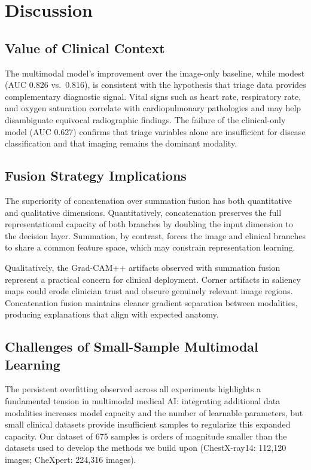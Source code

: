 \documentclass[conference]{IEEEtran}
\begin{document}
\section{Discussion}\label{sec:discussion}

\subsection{Value of Clinical Context}

The multimodal model's improvement over the image-only baseline, while modest (AUC 0.826 vs.\ 0.816), is consistent with the hypothesis that triage data provides complementary diagnostic signal. Vital signs such as heart rate, respiratory rate, and oxygen saturation correlate with cardiopulmonary pathologies and may help disambiguate equivocal radiographic findings. The failure of the clinical-only model (AUC 0.627) confirms that triage variables alone are insufficient for disease classification and that imaging remains the dominant modality.

\subsection{Fusion Strategy Implications}

The superiority of concatenation over summation fusion has both quantitative and qualitative dimensions. Quantitatively, concatenation preserves the full representational capacity of both branches by doubling the input dimension to the decision layer. Summation, by contrast, forces the image and clinical branches to share a common feature space, which may constrain representation learning.

Qualitatively, the Grad-CAM++ artifacts observed with summation fusion represent a practical concern for clinical deployment. Corner artifacts in saliency maps could erode clinician trust and obscure genuinely relevant image regions. Concatenation fusion maintains cleaner gradient separation between modalities, producing explanations that align with expected anatomy.

\subsection{Challenges of Small-Sample Multimodal Learning}

The persistent overfitting observed across all experiments highlights a fundamental tension in multimodal medical AI: integrating additional data modalities increases model capacity and the number of learnable parameters, but small clinical datasets provide insufficient samples to regularize this expanded capacity. Our dataset of 675 samples is orders of magnitude smaller than the datasets used to develop the methods we build upon (ChestX-ray14: 112,120 images; CheXpert: 224,316 images).
\end{document}
